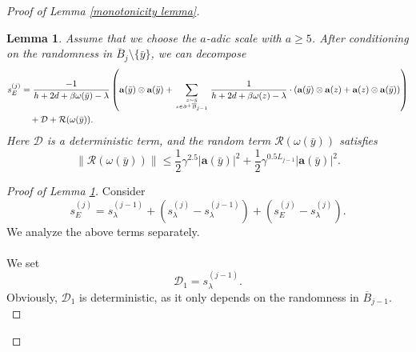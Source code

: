 \documentclass[11pt,reqno,UTF8,twoside]{amsart}
\newcommand{\spec}{{\rm Spec}}
\newcommand{\bfa}{\mathbf{a}}
\newcommand{\mcD}{\mathcal{D}}
\newcommand{\mcR}{\mathcal{R}}
\newcommand{\wtlambda}{\widetilde{\lambda}}
\newcommand{\barB}{\overline{B}}
\newcommand{\wtSjdeterministic}{\widetilde{S}^{(j),\text{de}}}
\newcommand{\smallSj}{s^{(j)}}
\newcommand{\smallSjminusone}{s^{(j-1)}}
\newtheorem{lem}[thm]{Lemma}
\theoremstyle{definition}
\numberwithin{equation}{section}
\begin{document}
\begin{proof}[Proof of Lemma \ref{monotonicity lemma}]

\begin{lem}\label{key decomposition lemma}
   Assume that we choose the $a$-adic scale with $a\geq 5$. After conditioning on the randomness in $\barB_{j}\setminus \{\bar{y}\}$, we can decompose 
  {\small
  \begin{align*}
    \smallSj_E & = \frac{-1}{h+2d+\beta \omega(\bar{y})-\lambda}\left(\bfa(\bar{y})\otimes \bfa(\bar{y})+ \sum_{z\sim \bar{y} \atop z\in \partial^+\barB_{j-1}} \frac{1}{h+2d+\beta\omega(z)-\lambda } \cdot(\bfa(\bar{y}) \otimes  \bfa(z)+\bfa(z)\otimes\bfa(\bar{y})  )\right) \\
    \notag & \ \ \ + \mcD + \mcR(\omega(\bar{y})) .
  \end{align*}
  }
  Here $\mcD$ is a deterministic term, and the random term $\mcR(\omega(\bar{y}))$ satisfies
  \begin{equation}\label{estimate on mcR}
    \|\mcR(\omega(\bar{y}))\| \leq \frac{1}{2}\gamma^{2.5} |\bfa(\bar{y})|^2 + \frac{1}{2}\gamma^{0.5L_{j-1}} |\bfa(\bar{y})|^2.
  \end{equation}
\end{lem}
\begin{proof}[Proof of Lemma \ref{key decomposition lemma}]
 Consider 
 \begin{equation}\label{initial decomposition}
   \smallSj_E=\smallSjminusone_{\lambda}+(\smallSj_{\lambda}-\smallSjminusone_\lambda)+(\smallSj_E-\smallSj_{\lambda}).
 \end{equation}
 We analyze the above terms separately.\\

 \noindent {\Large   {\textbf{(Term $\smallSjminusone_{\lambda}$)}}  }\\
 
 \noindent We set 
 \begin{equation}\label{mcD1}
   \mcD_1=\smallSjminusone_{\lambda}.
 \end{equation}
 Obviously, $\mcD_1$ is deterministic, as it  only depends  on the randomness in $\barB_{j-1}$.\\





\end{proof}
\end{proof}
\end{document}

